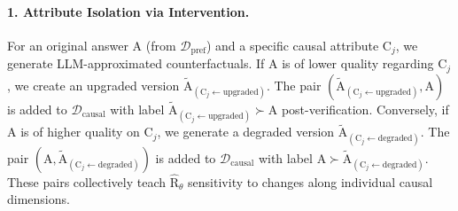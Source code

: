 \paragraph{1. Attribute Isolation via Intervention.}
For an original answer $\mathrm{A}$ (from $\mathcal{D}_{\mathrm{pref}}$) and a specific causal attribute $\mathrm{C}_j$, we generate LLM-approximated counterfactuals.
If $\mathrm{A}$ is of lower quality regarding $\mathrm{C}_j$, we create an upgraded version $\tilde{\mathrm{A}}_{(\mathrm{C}_j \leftarrow \text{upgraded})}$. The pair $(\tilde{\mathrm{A}}_{(\mathrm{C}_j \leftarrow \text{upgraded})}, \mathrm{A})$ is added to $\mathcal{D}_{\mathrm{causal}}$ with label $\tilde{\mathrm{A}}_{(\mathrm{C}_j \leftarrow \text{upgraded})} \succ \mathrm{A}$ post-verification.
Conversely, if $\mathrm{A}$ is of higher quality on $\mathrm{C}_j$, we generate a degraded version $\tilde{\mathrm{A}}_{(\mathrm{C}_j \leftarrow \text{degraded})}$. The pair $(\mathrm{A}, \tilde{\mathrm{A}}_{(\mathrm{C}_j \leftarrow \text{degraded})})$ is added to $\mathcal{D}_{\mathrm{causal}}$ with label $\mathrm{A} \succ \tilde{\mathrm{A}}_{(\mathrm{C}_j \leftarrow \text{degraded})}$.
These pairs collectively teach $\hat{\mathrm{R}}_\theta$ sensitivity to changes along individual causal dimensions.







